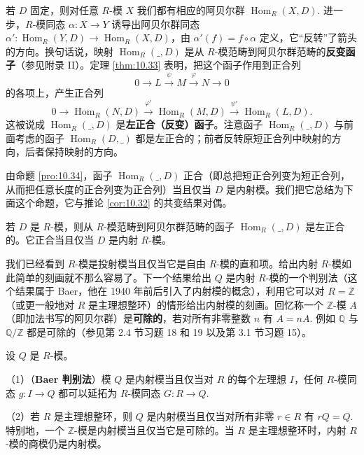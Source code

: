 若 \(D\) 固定，则对任意 \(R\)-模 \(X\) 我们都有相应的阿贝尔群 \(\operatorname{Hom}_R(X, D)\). 进一步，\(R\)-模同态 \(\alpha : X \to Y\) 诱导出阿贝尔群同态 \(\alpha' : \operatorname{Hom}_R(Y, D) \to \operatorname{Hom}_R(X, D)\)，由 \(\alpha'(f) = f \circ \alpha\) 定义，它“反转”了箭头的方向。换句话说，映射 \(\operatorname{Hom}_R(\_, D)\) 是从 \(R\)-模范畴到阿贝尔群范畴的\textbf{反变函子}（参见附录 II）。定理 \ref{thm:10.33} 表明，把这个函子作用到正合列
\[
0 \longrightarrow L \xrightarrow{\ \psi\ } M \xrightarrow{\ \varphi\ } N \longrightarrow 0
\]
的各项上，产生正合列
\[
0 \longrightarrow \operatorname{Hom}_R(N, D) \xrightarrow{\ \varphi'\ } \operatorname{Hom}_R(M, D) \xrightarrow{\ \psi'\ } \operatorname{Hom}_R(L, D).
\]
这被说成 \(\operatorname{Hom}_R(\_, D)\) 是\textbf{左正合（反变）函子}。注意函子 \(\operatorname{Hom}_R(\_, D)\) 与前面考虑的函子 \(\operatorname{Hom}_R(D, \_)\) 都是左正合的；前者反转原短正合列中映射的方向，后者保持映射的方向。

由命题 \ref{pro:10.34}，函子 \(\operatorname{Hom}_R(\_, D)\) 正合（即总把短正合列变为短正合列，从而把任意长度的正合列变为正合列）当且仅当 \(D\) 是内射模。我们把它总结为下面这个命题，它与推论 \ref{cor:10.32} 的共变结果对偶。

\begin{corollary}\label{cor:10.35}
若 \(D\) 是 \(R\)-模，则从 \(R\)-模范畴到阿贝尔群范畴的函子 \(\operatorname{Hom}_R(\_, D)\) 是左正合的。它正合当且仅当 \(D\) 是内射 \(R\)-模。
\end{corollary}

我们已经看到 \(R\)-模是投射模当且仅当它是自由 \(R\)-模的直和项。给出内射 \(R\)-模如此简单的刻画就不那么容易了。下一个结果给出 \(Q\) 是内射 \(R\)-模的一个判别法（这个结果属于 Baer，他在 1940 年前后引入了内射模的概念），利用它可以对 \(R = \mathbb{Z}\)（或更一般地对 \(R\) 是主理想整环）的情形给出内射模的刻画。回忆称一个 \(\mathbb{Z}\)-模 \(A\)（即加法书写的阿贝尔群）是\textbf{可除的}，若对所有非零整数 \(n\) 有 \(A = nA\). 例如 \(\mathbb{Q}\) 与 \(\mathbb{Q}/\mathbb{Z}\) 都是可除的（参见第 2.4 节习题 18 和 19 以及第 3.1 节习题 15）。

\begin{proposition}\label{pro:10.36}
设 \(Q\) 是 \(R\)-模。

（1）（\textbf{Baer 判别法}）模 \(Q\) 是内射模当且仅当对 \(R\) 的每个左理想 \(I\)，任何 \(R\)-模同态 \(g : I \to Q\) 都可以延拓为 \(R\)-模同态 \(G : R \to Q\).

（2）若 \(R\) 是主理想整环，则 \(Q\) 是内射模当且仅当对所有非零 \(r \in R\) 有 \(rQ = Q\). 特别地，一个 \(\mathbb{Z}\)-模是内射模当且仅当它是可除的。当 \(R\) 是主理想整环时，内射 \(R\)-模的商模仍是内射模。
\end{proposition}

